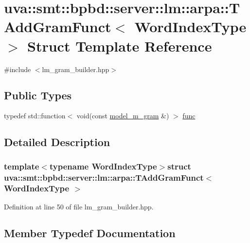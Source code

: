 \hypertarget{structuva_1_1smt_1_1bpbd_1_1server_1_1lm_1_1arpa_1_1_t_add_gram_funct}{}\section{uva\+:\+:smt\+:\+:bpbd\+:\+:server\+:\+:lm\+:\+:arpa\+:\+:T\+Add\+Gram\+Funct$<$ Word\+Index\+Type $>$ Struct Template Reference}
\label{structuva_1_1smt_1_1bpbd_1_1server_1_1lm_1_1arpa_1_1_t_add_gram_funct}


{\ttfamily \#include $<$lm\+\_\+gram\+\_\+builder.\+hpp$>$}

\subsection*{Public Types}
\begin{DoxyCompactItemize}
\item 
typedef std\+::function$<$ void(const \hyperlink{classuva_1_1smt_1_1bpbd_1_1server_1_1lm_1_1m__grams_1_1model__m__gram}{model\+\_\+m\+\_\+gram} \&) $>$ \hyperlink{structuva_1_1smt_1_1bpbd_1_1server_1_1lm_1_1arpa_1_1_t_add_gram_funct_ab4af90442a7127df3c8010eb3cec42e6}{func}
\end{DoxyCompactItemize}


\subsection{Detailed Description}
\subsubsection*{template$<$typename Word\+Index\+Type$>$struct uva\+::smt\+::bpbd\+::server\+::lm\+::arpa\+::\+T\+Add\+Gram\+Funct$<$ Word\+Index\+Type $>$}



Definition at line 50 of file lm\+\_\+gram\+\_\+builder.\+hpp.



\subsection{Member Typedef Documentation}
\hypertarget{structuva_1_1smt_1_1bpbd_1_1server_1_1lm_1_1arpa_1_1_t_add_gram_funct_ab4af90442a7127df3c8010eb3cec42e6}{}
